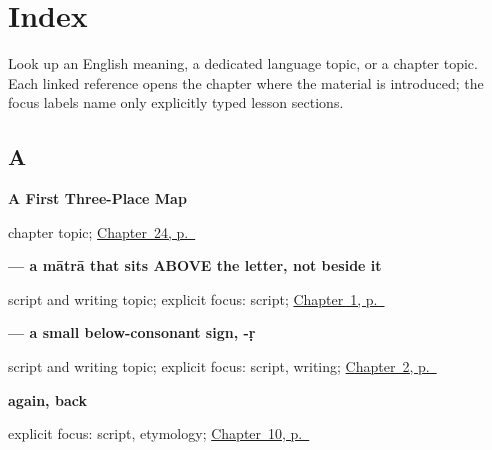 
\chapter*{Index}

Look up an English meaning, a dedicated language topic, or a chapter topic. Each linked reference opens the chapter where the material is introduced; the focus labels name only explicitly typed lesson sections.

\section*{A}

\noindent\begin{minipage}[t]{\linewidth}
\raggedright
\textbf{A First Three-Place Map}\par
\footnotesize chapter topic; \hyperref[ch:gu-first-three-places]{Chapter~24, p.~\pageref*{ch:gu-first-three-places}}
\end{minipage}\par\smallskip

\noindent\begin{minipage}[t]{\linewidth}
\raggedright
\textbf{ — a mātrā that sits ABOVE the letter, not beside it}\par
\footnotesize script and writing topic; explicit focus: script; \hyperref[ch:first-greeting-script]{Chapter~1, p.~\pageref*{ch:first-greeting-script}}
\end{minipage}\par\smallskip

\noindent\begin{minipage}[t]{\linewidth}
\raggedright
\textbf{ — a small below-consonant sign, -ṛ}\par
\footnotesize script and writing topic; explicit focus: script, writing; \hyperref[ch:greetings]{Chapter~2, p.~\pageref*{ch:greetings}}
\end{minipage}\par\smallskip

\noindent\begin{minipage}[t]{\linewidth}
\raggedright
\textbf{again, back}\enspace\emph{}\par
\footnotesize explicit focus: script, etymology; \hyperref[ch:farewells]{Chapter~10, p.~\pageref*{ch:farewells}}
\end{minipage}\par\smallskip

